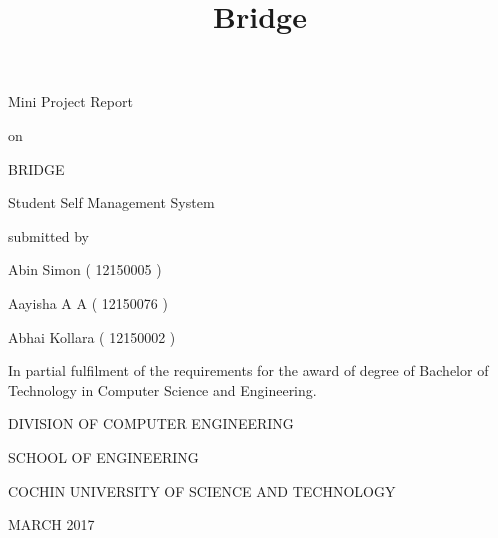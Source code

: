 \documentclass{article}
\renewcommand{\maketitle}{
\begin{center}
\LARGE
Mini Project Report

\hspace{1em}

on

\hspace{1em}

\huge
BRIDGE

\hspace{1em}
\Large
Student Self Management System

\hspace{1em}

submitted by

\hspace{1em}

\Large
Abin Simon ( 12150005 )

\Large
Aayisha A A ( 12150076 )

\Large
Abhai Kollara ( 12150002 )
\end{center}
}
\begin{document}
\title{Bridge}

\vspace*{\fill}

\maketitle

\begin{center}
\large
In partial fulfilment of the requirements for the award of degree of Bachelor of Technology in Computer Science and Engineering.

\hspace{1em}

\LARGE
DIVISION OF COMPUTER ENGINEERING 

SCHOOL OF ENGINEERING

COCHIN UNIVERSITY OF SCIENCE AND TECHNOLOGY

\hspace{1em}

\large
MARCH 2017
\end{center}

\vspace*{\fill}

\newpage

\vspace*{\fill}
\end{document}
